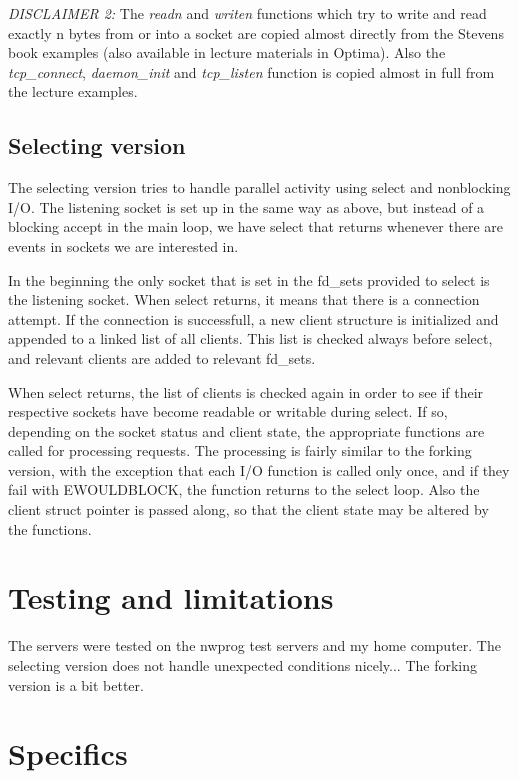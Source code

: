 \documentclass[a4paper,12pt]{article}
\begin{document}
\fussy


\emph{DISCLAIMER 2:} The \emph{readn} and \emph{writen} functions which try to write and read exactly n bytes from or into a socket are copied almost directly from the Stevens book examples (also available in lecture materials in Optima). Also the \emph{tcp\_connect}, \emph{daemon\_init} and \emph{tcp\_listen} function is copied almost in full from the lecture examples.

\subsection{Selecting version}

The selecting version tries to handle parallel activity using select and nonblocking I/O. The listening socket is set up in the same way as above, but instead of a blocking accept in the main loop, we have select that returns whenever there are events in sockets we are interested in.

In the beginning the only socket that is set in the fd\_sets provided to select is the listening socket. When select returns, it means that there is a connection attempt. If the connection is successfull, a new client structure is initialized and appended to a linked list of all clients. This list is checked always before select, and relevant clients are added to relevant fd\_sets.

When select returns, the list of clients is checked again in order to see if their respective sockets have become readable or writable during select. If so, depending on the socket status and client state, the appropriate functions are called for processing requests. The processing is fairly similar to the forking version, with the exception that each I/O function is called only once, and if they fail with EWOULDBLOCK, the function returns to the select loop. Also the client struct pointer is passed along, so that the client state may be altered by the functions.

\section{Testing and limitations}

The servers were tested on the nwprog test servers and my home computer. The selecting version does not handle unexpected conditions nicely... The forking version is a bit better.

\section{Specifics}
\end{document}
